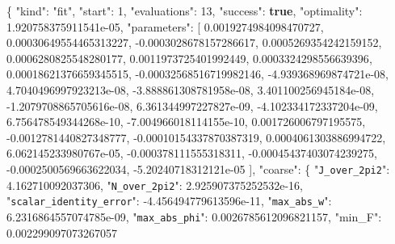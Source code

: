 \documentclass[
  10pt,
]{article}
\newenvironment{Shaded}{}{}
\newcommand{\DataTypeTok}[1]{\textcolor[rgb]{0.56,0.13,0.00}{#1}}
\newcommand{\DecValTok}[1]{\textcolor[rgb]{0.25,0.63,0.44}{#1}}
\newcommand{\FloatTok}[1]{\textcolor[rgb]{0.25,0.63,0.44}{#1}}
\newcommand{\FunctionTok}[1]{\textcolor[rgb]{0.02,0.16,0.49}{#1}}
\newcommand{\KeywordTok}[1]{\textcolor[rgb]{0.00,0.44,0.13}{\textbf{#1}}}
\newcommand{\OtherTok}[1]{\textcolor[rgb]{0.00,0.44,0.13}{#1}}
\newcommand{\StringTok}[1]{\textcolor[rgb]{0.25,0.44,0.63}{#1}}
\begin{document}
\begin{Shaded}
\begin{Highlighting}[]
\FunctionTok{\{}
  \DataTypeTok{"kind"}\FunctionTok{:} \StringTok{"fit"}\FunctionTok{,}
  \DataTypeTok{"start"}\FunctionTok{:} \DecValTok{1}\FunctionTok{,}
  \DataTypeTok{"evaluations"}\FunctionTok{:} \DecValTok{13}\FunctionTok{,}
  \DataTypeTok{"success"}\FunctionTok{:} \KeywordTok{true}\FunctionTok{,}
  \DataTypeTok{"optimality"}\FunctionTok{:} \FloatTok{1.920758375911541e{-}05}\FunctionTok{,}
  \DataTypeTok{"parameters"}\FunctionTok{:} \OtherTok{[}
    \FloatTok{0.0019274984098470727}\OtherTok{,}
    \FloatTok{0.00030649554465313227}\OtherTok{,}
    \FloatTok{{-}0.0003028678157286617}\OtherTok{,}
    \FloatTok{0.0005269354242159152}\OtherTok{,}
    \FloatTok{0.0006280825548280177}\OtherTok{,}
    \FloatTok{0.0011973725401992449}\OtherTok{,}
    \FloatTok{0.0003324298556639396}\OtherTok{,}
    \FloatTok{0.00018621376659345515}\OtherTok{,}
    \FloatTok{{-}0.00032568516719982146}\OtherTok{,}
    \FloatTok{{-}4.939368969874721e{-}08}\OtherTok{,}
    \FloatTok{4.7040496997923213e{-}08}\OtherTok{,}
    \FloatTok{{-}3.888861308781958e{-}08}\OtherTok{,}
    \FloatTok{3.401100256945184e{-}08}\OtherTok{,}
    \FloatTok{{-}1.2079708865705616e{-}08}\OtherTok{,}
    \FloatTok{6.361344997227827e{-}09}\OtherTok{,}
    \FloatTok{{-}4.102334172337204e{-}09}\OtherTok{,}
    \FloatTok{6.756478549344268e{-}10}\OtherTok{,}
    \FloatTok{{-}7.004966018114155e{-}10}\OtherTok{,}
    \FloatTok{0.001726006797195575}\OtherTok{,}
    \FloatTok{{-}0.0012781440827348777}\OtherTok{,}
    \FloatTok{{-}0.00010154337870387319}\OtherTok{,}
    \FloatTok{0.0004061303886994722}\OtherTok{,}
    \FloatTok{6.062145233980767e{-}05}\OtherTok{,}
    \FloatTok{{-}0.000378111555318311}\OtherTok{,}
    \FloatTok{{-}0.00045437403074239275}\OtherTok{,}
    \FloatTok{{-}0.0002500569663622034}\OtherTok{,}
    \FloatTok{{-}5.20240718312121e{-}05}
  \OtherTok{]}\FunctionTok{,}
  \DataTypeTok{"coarse"}\FunctionTok{:} \FunctionTok{\{}
    \DataTypeTok{"\nolinkurl{J_over_2pi2}"}\FunctionTok{:} \FloatTok{4.162710092037306}\FunctionTok{,}
    \DataTypeTok{"\nolinkurl{N_over_2pi2}"}\FunctionTok{:} \FloatTok{2.925907375252532e{-}16}\FunctionTok{,}
    \DataTypeTok{"\nolinkurl{scalar_identity_error}"}\FunctionTok{:} \FloatTok{{-}4.456494779613596e{-}11}\FunctionTok{,}
    \DataTypeTok{"\nolinkurl{max_abs_w}"}\FunctionTok{:} \FloatTok{6.2316864557074785e{-}09}\FunctionTok{,}
    \DataTypeTok{"\nolinkurl{max_abs_phi}"}\FunctionTok{:} \FloatTok{0.0026785612096821157}\FunctionTok{,}
    \DataTypeTok{"min\_F"}\FunctionTok{:} \FloatTok{0.002299097073267057}

\end{Highlighting}
\end{Shaded}
\end{document}
